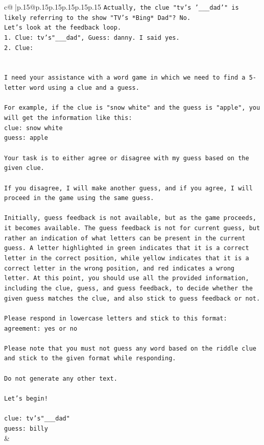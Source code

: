 \documentclass{article}
\begin{document}
{\begin{supertabular}{c@{$\;$}|p{.15\linewidth}@{}p{.15\linewidth}p{.15\linewidth}p{.15\linewidth}p{.15\linewidth}p{.15\linewidth}}
{{{\texttt{Actually, the clue "tv's '\_\_\_dad'" is likely referring to the show "TV's *Bing* Dad"? No.} \\
\texttt{Let's look at the feedback loop.} \\
\texttt{1. Clue: tv's"\_\_\_dad", Guess: danny. I said yes.} \\
\texttt{2. Clue:} \\
\\ 
\\ 
\texttt{I need your assistance with a word game in which we need to find a 5{-}letter word using a clue and a guess.} \\
\\ 
\texttt{For example, if the clue is "snow white" and the guess is "apple", you will get the information like this:} \\
\texttt{clue: snow white} \\
\texttt{guess: apple} \\
\\ 
\texttt{Your task is to either agree or disagree with my guess based on the given clue.} \\
\\ 
\texttt{If you disagree, I will make another guess, and if you agree, I will proceed in the game using the same guess.} \\
\\ 
\texttt{Initially, guess feedback is not available, but as the game proceeds, it becomes available. The guess feedback is not for current guess, but rather an indication of what letters can be present in the current guess. A letter highlighted in green indicates that it is a correct letter in the correct position, while yellow indicates that it is a correct letter in the wrong position, and red indicates a wrong letter. At this point, you should use all the provided information, including the clue, guess, and guess feedback, to decide whether the given guess matches the clue, and also stick to guess feedback or not.} \\
\\ 
\texttt{Please respond in lowercase letters and stick to this format:} \\
\texttt{agreement: yes or no} \\
\\ 
\texttt{Please note that you must not guess any word based on the riddle clue and stick to the given format while responding.} \\
\\ 
\texttt{Do not generate any other text.} \\
\\ 
\texttt{Let's begin!} \\
\\ 
\texttt{clue: tv's"\_\_\_dad"} \\
\texttt{guess: billy} \\
            }
        }
    }
    & \\ \\


\end{supertabular}}
\end{document}
